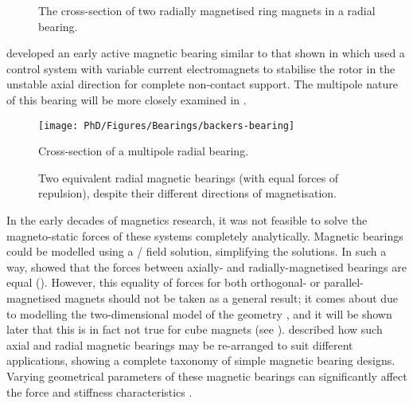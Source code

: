 \documentclass[11pt,a4paper]{memoir}
\begin{document}
\begin{figure}
  \caption[Radial bearing cross section.]{The cross-section of two radially
magnetised ring magnets in a radial bearing.}
\end{figure}

\textcite{backers1961} developed an early active magnetic bearing similar to that shown in  which used a control system with variable current electromagnets to stabilise the rotor in the unstable axial direction for complete non-contact support.
The multipole nature of this bearing will be more closely examined in .

\begin{figure}
  \begin{minipage}{0.45\linewidth}\centering
  \texttt{[image: PhD/Figures/Bearings/backers-bearing]}
  \caption[Multipole bearing cross section.]{Cross-section of a
    multipole radial bearing.}
  \end{minipage}\hfill
  \begin{minipage}{0.45\linewidth}\centering
  \caption[Two equivalent radial magnetic bearings.]{Two equivalent radial magnetic bearings
(with equal forces of repulsion), despite their different directions of
magnetisation.}
  \end{minipage}
\end{figure}

In the early decades of magnetics research, it was not feasible to solve the magneto-static forces of these systems completely analytically.
Magnetic bearings could be modelled using a \twoD/ field solution, simplifying the solutions.
In such a way, \textcite{yonnet1978} showed that the forces between axially- and radially-magnetised bearings are equal ().
However, this equality of forces for both orthogonal- or parallel-magnetised magnets should not be taken as a general result; it comes about due to modelling the two-dimensional model of the geometry \cite{anderson1987-ietm}, and it will be shown later that this is in fact not true for cube magnets (see ).
\textcite{yonnet1981} described how such axial and radial magnetic bearings may be re-arranged to suit different applications, showing a complete taxonomy of simple magnetic bearing designs.
Varying geometrical parameters of these magnetic bearings can significantly affect the force and stiffness characteristics \cite{bassani2006-trib-int}.
\end{document}
